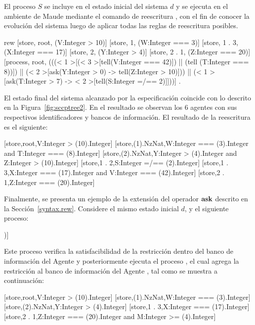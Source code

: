 El proceso $S$ se incluye en el estado inicial del sistema $d$ y se ejecuta en el ambiente de Maude mediante el comando de reescritura , con el fin de conocer la evoluci\'on del sistema luego de aplicar todas las reglas de reescritura posibles.

\begin{maude}
rew { [store, root, (V:Integer > 10)]
  [store, 1, (W:Integer === 3)]
  [store, 1 . 3, (X:Integer === 17)]
  [store, 2, (Y:Integer > 4)]
  [store, 2 . 1, (Z:Integer === 20)]
  [process, root, (((< 1 >[(< 3 >[tell(V:Integer === 42)]) || 
     (tell (T:Integer === 8))]) || 
     (< 2 >[ask(Y:Integer > 0) -> tell(Z:Integer > 10)])) || 
     (< 1 >[ask(T:Integer > 7) -> 
      < 2 >[tell(S:Integer =/== 2)]]))] } .
\end{maude}

El estado final del sistema alcanzado por la especificaci\'on coincide con lo descrito en la Figura~\ref{fig:sccptree2}. En el resultado se observan los 6 agentes con sus respectivos identificadores y bancos de informaci\'on. El resultado de la reescritura es el siguiente:

\begin{maude}
{ [store,root,V:Integer > (10).Integer]
  [store,(1).NzNat,W:Integer === (3).Integer 
           and T:Integer === (8).Integer] 
  [store,(2).NzNat,Y:Integer > (4).Integer 
           and Z:Integer > (10).Integer] 
  [store,1 . 2,S:Integer =/== (2).Integer] 
  [store,1 . 3,X:Integer === (17).Integer 
           and V:Integer === (42).Integer] 
  [store,2 . 1,Z:Integer === (20).Integer] }
\end{maude}

Finalmente, se presenta un ejemplo de la extensi\'on del operador ${\bf ask}$ descrito en la Secci\'on~\ref{syntax.rew}. Considere el mismo estado inicial $d$, y el siguiente proceso:

\begin{maude}
[process, root, (ask< 1 >(W:Integer < 15) -> 
   < 2 . 1 >[tell(M:Integer >= 4)])]
\end{maude}

Este proceso verifica la satisfacibilidad de la restricci\'on  dentro del banco de informaci\'on del Agente  y posteriormente ejecuta el proceso , el cual agrega la restricci\'on  al banco de informaci\'on del Agente , tal como se muestra a continuaci\'on:

\begin{maude}
{ [store,root,V:Integer > (10).Integer] 
  [store,(1).NzNat,W:Integer === (3).Integer] 
  [store,(2).NzNat,Y:Integer > (4).Integer] 
  [store,1 . 3,X:Integer === (17).Integer] 
  [store,2 . 1,Z:Integer === (20).Integer 
           and M:Integer >= (4).Integer] }
\end{maude}

